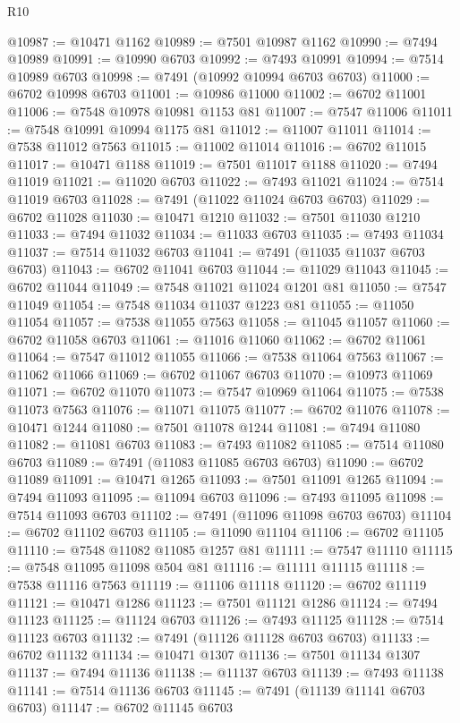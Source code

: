 \begin{lexlean}{R10}
\begin{coremodule}
@10987 := @10471 @1162
@10989 := @7501 @10987 @1162
@10990 := @7494 @10989
@10991 := @10990 @6703
@10992 := @7493 @10991
@10994 := @7514 @10989 @6703
@10998 := @7491 (@10992 @10994 @6703 @6703)
@11000 := @6702 @10998 @6703
@11001 := @10986 @11000
@11002 := @6702 @11001
@11006 := @7548 @10978 @10981 @1153 @81
@11007 := @7547 @11006
@11011 := @7548 @10991 @10994 @1175 @81
@11012 := @11007 @11011
@11014 := @7538 @11012 @7563
@11015 := @11002 @11014
@11016 := @6702 @11015
@11017 := @10471 @1188
@11019 := @7501 @11017 @1188
@11020 := @7494 @11019
@11021 := @11020 @6703
@11022 := @7493 @11021
@11024 := @7514 @11019 @6703
@11028 := @7491 (@11022 @11024 @6703 @6703)
@11029 := @6702 @11028
@11030 := @10471 @1210
@11032 := @7501 @11030 @1210
@11033 := @7494 @11032
@11034 := @11033 @6703
@11035 := @7493 @11034
@11037 := @7514 @11032 @6703
@11041 := @7491 (@11035 @11037 @6703 @6703)
@11043 := @6702 @11041 @6703
@11044 := @11029 @11043
@11045 := @6702 @11044
@11049 := @7548 @11021 @11024 @1201 @81
@11050 := @7547 @11049
@11054 := @7548 @11034 @11037 @1223 @81
@11055 := @11050 @11054
@11057 := @7538 @11055 @7563
@11058 := @11045 @11057
@11060 := @6702 @11058 @6703
@11061 := @11016 @11060
@11062 := @6702 @11061
@11064 := @7547 @11012 @11055
@11066 := @7538 @11064 @7563
@11067 := @11062 @11066
@11069 := @6702 @11067 @6703
@11070 := @10973 @11069
@11071 := @6702 @11070
@11073 := @7547 @10969 @11064
@11075 := @7538 @11073 @7563
@11076 := @11071 @11075
@11077 := @6702 @11076
@11078 := @10471 @1244
@11080 := @7501 @11078 @1244
@11081 := @7494 @11080
@11082 := @11081 @6703
@11083 := @7493 @11082
@11085 := @7514 @11080 @6703
@11089 := @7491 (@11083 @11085 @6703 @6703)
@11090 := @6702 @11089
@11091 := @10471 @1265
@11093 := @7501 @11091 @1265
@11094 := @7494 @11093
@11095 := @11094 @6703
@11096 := @7493 @11095
@11098 := @7514 @11093 @6703
@11102 := @7491 (@11096 @11098 @6703 @6703)
@11104 := @6702 @11102 @6703
@11105 := @11090 @11104
@11106 := @6702 @11105
@11110 := @7548 @11082 @11085 @1257 @81
@11111 := @7547 @11110
@11115 := @7548 @11095 @11098 @504 @81
@11116 := @11111 @11115
@11118 := @7538 @11116 @7563
@11119 := @11106 @11118
@11120 := @6702 @11119
@11121 := @10471 @1286
@11123 := @7501 @11121 @1286
@11124 := @7494 @11123
@11125 := @11124 @6703
@11126 := @7493 @11125
@11128 := @7514 @11123 @6703
@11132 := @7491 (@11126 @11128 @6703 @6703)
@11133 := @6702 @11132
@11134 := @10471 @1307
@11136 := @7501 @11134 @1307
@11137 := @7494 @11136
@11138 := @11137 @6703
@11139 := @7493 @11138
@11141 := @7514 @11136 @6703
@11145 := @7491 (@11139 @11141 @6703 @6703)
@11147 := @6702 @11145 @6703

\end{coremodule}
\end{lexlean}
